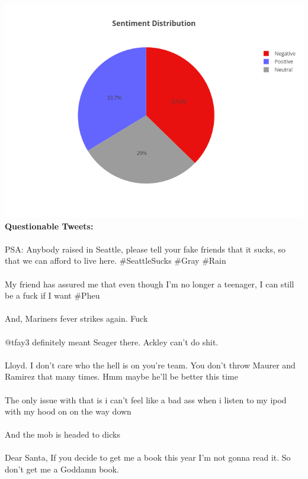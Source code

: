 \documentclass[12pt]{article}
\begin{document}
\begin{center}
\begin{center}
\bigbreak
\includegraphics[width=0.8 \textwidth]{sentiment_pie_chart.png}\\
\newpage
\noindent \large \textbf{Questionable Tweets:}\\
\\ PSA: Anybody raised in Seattle, please tell your fake friends that it sucks, so that we can afford to live here. \#SeattleSucks \#Gray \#Rain\\ \\ My friend has assured me that even though I'm no longer a teenager, I can still be a fuck if I want \#Pheu\\ \\ And, Mariners fever strikes again. Fuck\\ \\ @tfay3 definitely meant Seager there. Ackley can't do shit.\\ \\ Lloyd. I don't care who the hell is on you're team. You don't throw Maurer and Ramirez that many times. Hmm maybe he'll be better this time\\ \\ The only issue with that is i can't feel like a bad ass when i listen to my ipod with my hood on on the way down\\ \\ And the mob is headed to dicks\\ \\ Dear Santa,
If you decide to get me a book this year I'm not gonna read it. So don't get me a Goddamn book.

\end{center}
\end{center}
\end{document}
